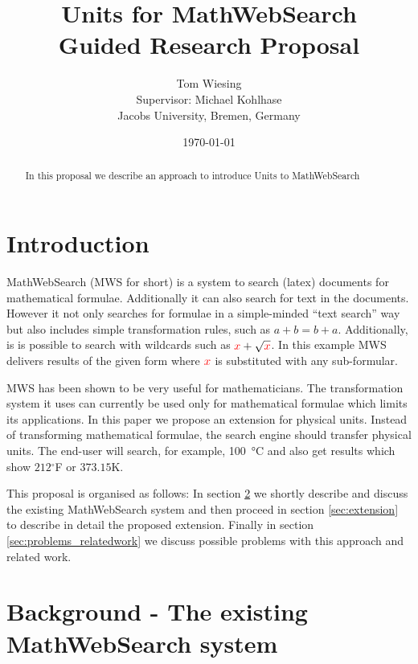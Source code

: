 \documentclass[11pt]{article}
\title{Units for MathWebSearch\ednote{Preliminary Title}\\ \vspace{2 mm} Guided Research Proposal}
\author{Tom Wiesing\\Supervisor: Michael Kohlhase\\Jacobs University, Bremen, Germany}
\date{\today}
\begin{document}
\maketitle

\begin{abstract}
  In this proposal we describe an approach to introduce Units to MathWebSearch
\end{abstract}

\section{Introduction}


MathWebSearch (MWS for short) is a system to search (latex) documents for mathematical formulae. Additionally it can also search for text in the documents. However it not only searches for formulae in a simple-minded ``text search'' way but also includes simple transformation rules, such as $a + b = b + a$. Additionally, is is possible to search with wildcards such as $ { \color{red} x} + \sqrt{\color{red} x}$. In this example MWS delivers results of the given form where $\color{red} x$ is substituted with any sub-formular.

MWS has been shown to be very useful for mathematicians. The transformation system it uses can currently be used only for mathematical formulae which limits its applications. In this paper we propose an extension for physical units. Instead of transforming mathematical formulae, the search engine should transfer physical units.
The end-user will search, for example, \SI{100}{\degreeCelsius} and also get results which show $212$$^\circ$F or $373.15$K.

This proposal is organised as follows: In section \ref{sec:mws} we shortly describe and discuss the existing MathWebSearch system and then proceed in section \ref{sec:extension} to describe in detail the proposed extension. Finally in section \ref{sec:problems_relatedwork} we discuss possible problems with this approach and related work.

\section{Background - The existing MathWebSearch system}
\label{sec:mws}
\end{document}
